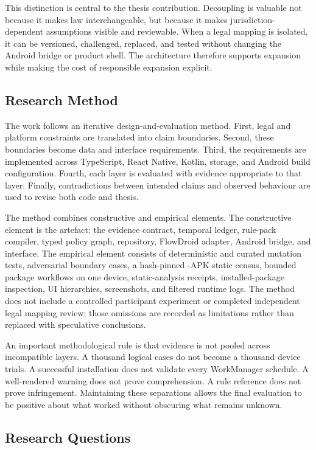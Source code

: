 This distinction is central to the thesis contribution. Decoupling is valuable not because it makes law interchangeable, but because it makes jurisdiction-dependent assumptions visible and reviewable. When a legal mapping is isolated, it can be versioned, challenged, replaced, and tested without changing the Android bridge or product shell. The architecture therefore supports expansion while making the cost of responsible expansion explicit.

\subsection{Research Method}

The work follows an iterative design-and-evaluation method. First, legal and platform constraints are translated into claim boundaries. Second, these boundaries become data and interface requirements. Third, the requirements are implemented across TypeScript, React Native, Kotlin, storage, and Android build configuration. Fourth, each layer is evaluated with evidence appropriate to that layer. Finally, contradictions between intended claims and observed behaviour are used to revise both code and thesis.

The method combines constructive and empirical elements. The constructive element is the artefact: the evidence contract, temporal ledger, rule-pack compiler, typed policy graph, repository, FlowDroid adapter, Android bridge, and interface. The empirical element consists of deterministic and curated mutation tests, adversarial boundary cases, a hash-pinned \FDroidCensusN{}-APK static census, \DevicePackagesN{} bounded package workflows on one device, static-analysis receipts, installed-package inspection, UI hierarchies, screenshots, and filtered runtime logs. The method does not include a controlled participant experiment or completed independent legal mapping review; those omissions are recorded as limitations rather than replaced with speculative conclusions.

An important methodological rule is that evidence is not pooled across incompatible layers. A thousand logical cases do not become a thousand device trials. A successful installation does not validate every WorkManager schedule. A well-rendered warning does not prove comprehension. A rule reference does not prove infringement. Maintaining these separations allows the final evaluation to be positive about what worked without obscuring what remains unknown.

\subsection{Research Questions}

